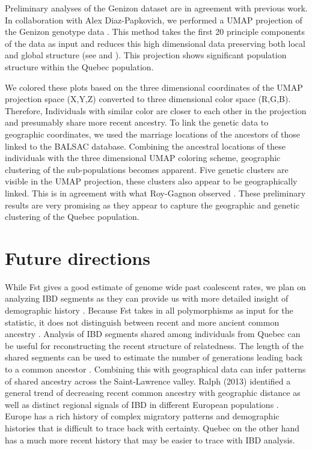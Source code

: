 \documentclass[
11pt, %
oneside, %
english, %
doublespacing, %
headsepline, %
chapterinoneline, %
]{MastersDoctoralThesis} %
\begin{document}
Preliminary analyses of the Genizon dataset are in agreement with previous work.
In collaboration with Alex Diaz-Papkovich, we performed a UMAP projection of the Genizon genotype data \citep{mcinnes2018umap,diaz2018}.
This method takes the first 20 principle components of the data as input and reduces this high dimensional data preserving both local and global structure (see \citep{diaz2018} and \citep{mcinnes2018umap}).
This projection shows significant population structure within the Quebec population. 

We colored these plots based on the three dimensional coordinates of the UMAP projection space (X,Y,Z) converted to three dimensional color space (R,G,B).
Therefore, Individuals with similar color are closer to each other in the projection and presumably share more recent ancestry.
To link the genetic data to geographic coordinates, we used the marriage locations of the ancestors of those linked to the BALSAC database.
Combining the ancestral locations of these individuals with the three dimensional UMAP coloring scheme, geographic clustering of the sub-populations becomes apparent.
Five genetic clusters are visible in the UMAP projection, these clusters also appear to be geographically linked.
This is in agreement with what Roy-Gagnon observed \citep{Roy-Gagnon2011}.
These preliminary results are very promising as they appear to capture the geographic and genetic clustering of the Quebec population.

\section{Future directions}
While Fst gives a good estimate of genome wide past coalescent rates, we plan on analyzing IBD segments as they can provide us with more detailed insight of demographic history \citep{Charlesworth2003, Ralph2013, Baharian2016}.
Because Fst takes in all polymorphisms as input for the statistic, it does not distinguish between recent and more ancient common ancestry \citep{Ralph2013}.
Analysis of IBD segments shared among individuals from Quebec can be useful for reconstructing the recent structure of relatedness.
The length of the shared segments can be used to estimate the number of generations leading back to a common ancestor \citep{Palamara2015,Campbell2012,Baharian2016}.
Combining this with geographical data can infer patterns of shared ancestry across the Saint-Lawrence valley.
Ralph (2013) identified a general trend of decreasing recent common ancestry with geographic distance as well as distinct regional signals of IBD in different European populations \citep{Ralph2013}.
Europe has a rich history of complex migratory patterns and demographic histories that is difficult to trace back with certainty. 
Quebec on the other hand has a much more recent history that may be easier to trace with IBD analysis.
\end{document}
